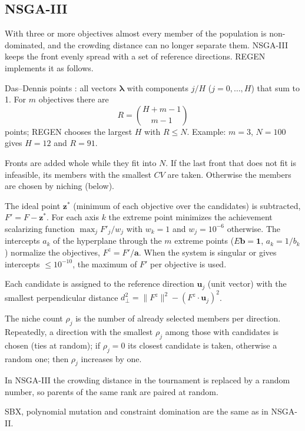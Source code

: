 \subsection{NSGA-III}
With three or more objectives almost every member of the population is non-dominated, and the crowding distance can
no longer separate them. NSGA-III \citep{deb2014} keeps the front evenly spread with a set of reference directions.
REGEN implements it as follows.
\begin{description}[style=nextline]
  \item[Reference directions] Das--Dennis points \citep{das1998}: all vectors $\boldsymbol\lambda$ with components
        $j/H$ ($j=0,\dots,H$) that sum to 1. For $m$ objectives there are
        \begin{equation}
        R=\binom{H+m-1}{m-1}
        \label{eq:ch08-refs}
        \end{equation}
        points; REGEN chooses the largest $H$ with $R\le N$. Example: $m=3$, $N=100$ gives $H=12$ and $R=91$.
  \item[Selection] Fronts are added whole while they fit into $N$. If the last front that does not fit is infeasible,
        its members with the smallest $CV$ are taken. Otherwise the members are chosen by niching (below).
  \item[Normalization] The ideal point $\mathbf z^*$ (minimum of each objective over the candidates) is subtracted,
        $F'=F-\mathbf z^*$. For each axis $k$ the extreme point minimizes the achievement scalarizing function
        $\max_j F'_j/w_j$ with $w_k=1$ and $w_j=10^{-6}$ otherwise. The intercepts $a_k$ of the hyperplane through
        the $m$ extreme points ($E\mathbf b=\mathbf 1$, $a_k=1/b_k$) normalize the objectives, $F^z=F'/\mathbf a$.
        When the system is singular or gives intercepts $\le10^{-10}$, the maximum of $F'$ per objective is used.
  \item[Association] Each candidate is assigned to the reference direction $\mathbf u_j$ (unit vector) with the
        smallest perpendicular distance $d_\perp^2=\|F^z\|^2-(F^z\cdot\mathbf u_j)^2$.
  \item[Niching] The niche count $\rho_j$ is the number of already selected members per direction. Repeatedly, a
        direction with the smallest $\rho_j$ among those with candidates is chosen (ties at random); if $\rho_j=0$
        its closest candidate is taken, otherwise a random one; then $\rho_j$ increases by one.
  \item[Parent selection] In NSGA-III the crowding distance in the tournament is replaced by a random number, so
        parents of the same rank are paired at random.
\end{description}
SBX, polynomial mutation and constraint domination are the same as in NSGA-II.

